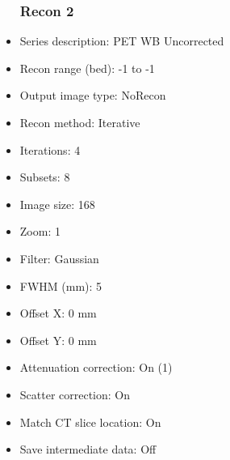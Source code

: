 \documentclass[12pt]{article}
\begin{document}
\begin{itemize}
\subsubsection{Recon 2}
\item Series description: PET WB Uncorrected
\item Recon range (bed): -1 to -1
\item Output image type: NoRecon
\item Recon method: Iterative
\item Iterations: 4
\item Subsets: 8
\item Image size: 168
\item Zoom: 1
\item Filter: Gaussian
\item FWHM (mm): 5
\item Offset X: 0 mm
\item Offset Y: 0 mm
\item Attenuation correction: On (1)
\item Scatter correction: On
\item Match CT slice location: On
\item Save intermediate data: Off
\end{itemize}
\end{document}
